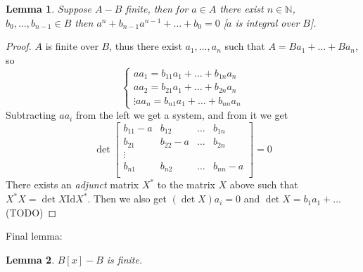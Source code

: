 \documentclass[12pt]{article}
\newcommand{\Id}{\mathrm{Id}}
\newtheorem{lemma}{Lemma}[section]
\begin{document}
    \begin{lemma}
        Suppose $A - B$ finite, then for $a \in A$ there exist $n \in \mathbb{N}$, $b_0, \dots, b_{n-1} \in B$ then $a^n + b_{n-1}a^{n-1} + \dots + b_0 = 0$ [$a$ is integral over $B$].
    \end{lemma}
    \begin{proof}
        $A$ is finite over $B$, thus there exist $a_1, \dots, a_n$ such that $A = Ba_1 + \dots + Ba_n$, so 
        $$\begin{cases}
            aa_1 = b_{11}a_1 + \dots + b_{1n}a_n \\
            aa_2 = b_{21}a_1 + \dots + b_{2n}a_n \\
            \vdots 
            aa_n = b_{n1}a_1 + \dots + b_{nn}a_n
        \end{cases}
        $$
        Subtracting $aa_i$ from the left we get a system, and from it we get 
        $$\det \begin{bmatrix}
            b_{11}-a & b_{12} & \dots & b_{1n} \\
            b_{21} & b_{22}-a & \dots & b_{2n} \\
            \vdots \\
            b_{n1} & b_{n2} & \dots & b_{nn}-a \\
        \end{bmatrix} = 0$$
        There exists an \textit{adjunct} matrix $X^*$ to the matrix $X$ above such that $X^*X = \det X \Id X^*$. Then we also get 
        $(\det X)a_i = 0$ and $\det X = b_1a_1 + \dots $ (TODO) 
    \end{proof}
    Final lemma:
    \begin{lemma}
         $B[x] - B$ is finite.
    \end{lemma}
\end{document}
